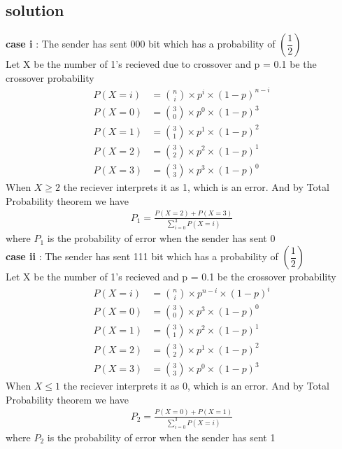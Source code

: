 \documentclass[11pt,a4,twocolumn]{article}
\begin{document}
\begin{flushleft}
\section*{solution}
\textbf{case i} : The sender has sent 000 bit which has a probability of $\left(\dfrac{1}{2}\right)$\\
Let X be the number of 1's recieved due to crossover and p = 0.1 be the crossover probability\\
\begin{align}
P(X = i) &= \binom{n}{i}\times p^i\times (1-p)^{n-i}\\
P(X = 0) &= \binom{3}{0}\times p^0\times (1-p)^{3}\nonumber\\
P(X = 1) &= \binom{3}{1}\times p^1\times (1-p)^{2}\nonumber\\
P(X = 2) &= \binom{3}{2}\times p^2\times (1-p)^{1}\nonumber\\
P(X = 3) &= \binom{3}{3}\times p^3\times (1-p)^{0}\nonumber
\end{align}
When $X \geq 2 $ the reciever interprets it as 1, which is an error. And by Total Probability theorem we have\\
\begin{align}
P_1 = \frac{P(X = 2) + P(X = 3)}{\sum_{i=0}^3P(X = i)}
\end{align}
where $P_1$ is the probability of error when the sender has sent 0\\
\textbf{case ii} : The sender has sent 111 bit which has a probability of $\left(\dfrac{1}{2}\right)$\\
Let X be the number of 1's recieved and p = 0.1 be the crossover probability\\
\begin{align}
P(X = i) &= \binom{n}{i}\times p^{n-i}\times (1-p)^i\\
P(X = 0) &= \binom{3}{0}\times p^3\times (1-p)^{0}\nonumber\\
P(X = 1) &= \binom{3}{1}\times p^2\times (1-p)^{1}\nonumber\\
P(X = 2) &= \binom{3}{2}\times p^1\times (1-p)^{2}\nonumber\\
P(X = 3) &= \binom{3}{3}\times p^0\times (1-p)^{3}\nonumber
\end{align}
When $X \leq 1 $ the reciever interprets it as 0, which is an error. And by Total Probability theorem we have\\
\begin{align}
P_2 = \frac{P(X = 0) + P(X = 1)}{\sum_{i=0}^3P(X = i)}
\end{align}
where $P_2$ is the probability of error when the sender has sent 1\\

\end{flushleft}
\end{document}
